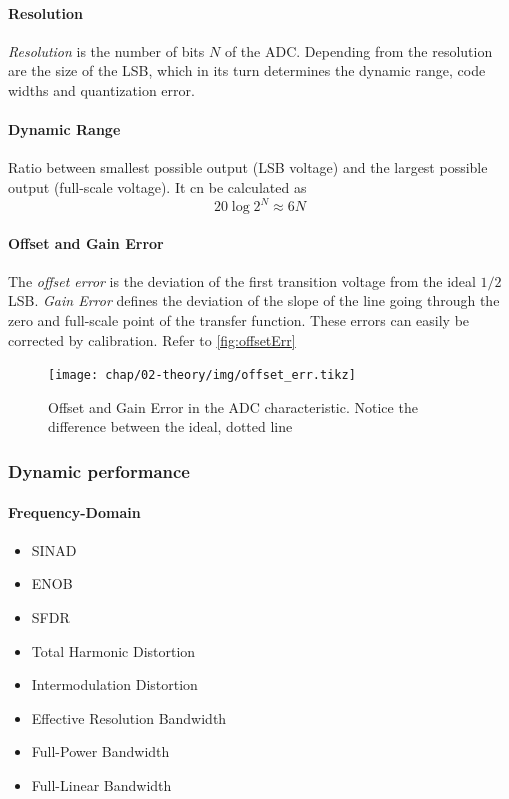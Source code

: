 \paragraph{Resolution}
\textit{Resolution} is the number of bits $N$ of the ADC. Depending from the resolution are the size of the LSB, which in its turn determines the dynamic range, code widths and quantization error.

\paragraph{Dynamic Range}
Ratio between smallest possible output (LSB voltage) and the largest possible output (full-scale voltage). It cn be calculated as
\begin{equation}
	20 \log 2^{N} \approx 6N
\end{equation}


\paragraph{Offset and Gain Error}
The \textit{offset error} is the deviation of the first transition voltage from the ideal $1/2$ LSB. \textit{Gain Error} defines the deviation of the slope of the line going through the zero and full-scale point of the transfer function. These errors can easily be corrected by calibration. Refer to \autoref{fig:offsetErr}

\begin{figure}[H]
	\centering
	\texttt{[image: chap/02-theory/img/offset\_err.tikz]}
	\caption{Offset and Gain Error in the ADC characteristic. Notice the difference between the ideal, dotted line}
	\label{fig:offsetErr}
\end{figure}

\subsubsection*{Dynamic performance}

\paragraph{Frequency-Domain}
\begin{itemize}
	\item SINAD
	\item ENOB
	\item SFDR
	\item Total Harmonic Distortion
	\item Intermodulation Distortion
	\item Effective Resolution Bandwidth
	\item Full-Power Bandwidth
	\item Full-Linear Bandwidth
\end{itemize}
